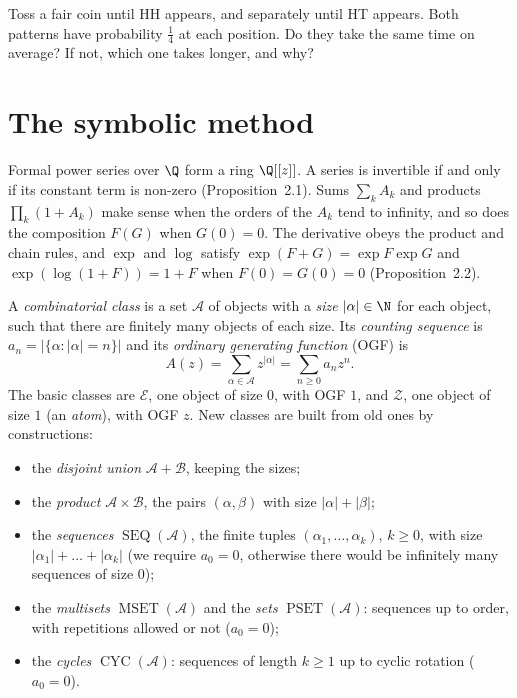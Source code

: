 \begin{think}
Toss a fair coin until HH appears, and separately until HT appears. Both patterns have probability $\frac14$ at each position.
Do they take the same time on average? If not, which one takes longer, and why?
\end{think}

\section{The symbolic method}

\begin{reminder}
Formal power series over $\Q$ form a ring $\Q[[z]]$. A series is invertible if and only if its constant term is non-zero
(Proposition~2.1). Sums $\sum_kA_k$ and products $\prod_k(1+A_k)$ make sense when the orders of the $A_k$ tend to infinity, and so does
the composition $F(G)$ when $G(0)=0$. The derivative obeys the product and chain rules, and $\exp$ and $\log$ satisfy
$\exp(F+G)=\exp F\exp G$ and $\exp(\log(1+F))=1+F$ when $F(0)=G(0)=0$ (Proposition~2.2).
\end{reminder}

A \emph{combinatorial class} is a set $\mathcal A$ of objects with a \emph{size} $|\alpha|\in\N$ for each object, such that there are finitely many
objects of each size. Its \emph{counting sequence} is $a_n=|\{\alpha:|\alpha|=n\}|$ and its \emph{ordinary generating function} (OGF) is
\[
A(z)=\sum_{\alpha\in\mathcal A}z^{|\alpha|}=\sum_{n\ge0}a_nz^n .
\]
The basic classes are $\mathcal E$, one object of size $0$, with OGF $1$, and $\mathcal Z$, one object of size $1$ (an \emph{atom}), with OGF $z$. New
classes are built from old ones by constructions:
\begin{itemize}
\item the \emph{disjoint union} $\mathcal A+\mathcal B$, keeping the sizes;
\item the \emph{product} $\mathcal A\times\mathcal B$, the pairs $(\alpha,\beta)$ with size $|\alpha|+|\beta|$;
\item the \emph{sequences} $\operatorname{SEQ}(\mathcal A)$, the finite tuples $(\alpha_1,\dots,\alpha_k)$, $k\ge0$, with size $|\alpha_1|+\dots+|\alpha_k|$ (we require $a_0=0$, otherwise
there would be infinitely many sequences of size $0$);
\item the \emph{multisets} $\operatorname{MSET}(\mathcal A)$ and the \emph{sets} $\operatorname{PSET}(\mathcal A)$: sequences up to order, with repetitions allowed or not ($a_0=0$);
\item the \emph{cycles} $\operatorname{CYC}(\mathcal A)$: sequences of length $k\ge1$ up to cyclic rotation ($a_0=0$).
\end{itemize}

